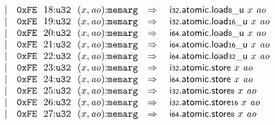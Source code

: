 $$\begin{array}[t]{@{}lrrl@{}l@{}l@{}l@{}}
& & | & \mathtt{0xFE}~~18{:}{\mathtt{u32}}~~(x, {\mathit{ao}}){:}{\mathtt{memarg}} & \quad\Rightarrow\quad{} & {\mathsf{i{\scriptstyle 32}}{.}\mathsf{atomic}{.}\mathsf{load}}{{\mathsf{{\scriptstyle 8}}}{\mathsf{\_}}{\mathsf{u}}}~x~{\mathit{ao}} \\
& & | & \mathtt{0xFE}~~19{:}{\mathtt{u32}}~~(x, {\mathit{ao}}){:}{\mathtt{memarg}} & \quad\Rightarrow\quad{} & {\mathsf{i{\scriptstyle 32}}{.}\mathsf{atomic}{.}\mathsf{load}}{{\mathsf{{\scriptstyle 16}}}{\mathsf{\_}}{\mathsf{u}}}~x~{\mathit{ao}} \\
& & | & \mathtt{0xFE}~~20{:}{\mathtt{u32}}~~(x, {\mathit{ao}}){:}{\mathtt{memarg}} & \quad\Rightarrow\quad{} & {\mathsf{i{\scriptstyle 64}}{.}\mathsf{atomic}{.}\mathsf{load}}{{\mathsf{{\scriptstyle 8}}}{\mathsf{\_}}{\mathsf{u}}}~x~{\mathit{ao}} \\
& & | & \mathtt{0xFE}~~21{:}{\mathtt{u32}}~~(x, {\mathit{ao}}){:}{\mathtt{memarg}} & \quad\Rightarrow\quad{} & {\mathsf{i{\scriptstyle 64}}{.}\mathsf{atomic}{.}\mathsf{load}}{{\mathsf{{\scriptstyle 16}}}{\mathsf{\_}}{\mathsf{u}}}~x~{\mathit{ao}} \\
& & | & \mathtt{0xFE}~~22{:}{\mathtt{u32}}~~(x, {\mathit{ao}}){:}{\mathtt{memarg}} & \quad\Rightarrow\quad{} & {\mathsf{i{\scriptstyle 64}}{.}\mathsf{atomic}{.}\mathsf{load}}{{\mathsf{{\scriptstyle 32}}}{\mathsf{\_}}{\mathsf{u}}}~x~{\mathit{ao}} \\
& & | & \mathtt{0xFE}~~23{:}{\mathtt{u32}}~~(x, {\mathit{ao}}){:}{\mathtt{memarg}} & \quad\Rightarrow\quad{} & \mathsf{i{\scriptstyle 32}}{.}\mathsf{atomic}{.}\mathsf{store}~x~{\mathit{ao}} \\
& & | & \mathtt{0xFE}~~24{:}{\mathtt{u32}}~~(x, {\mathit{ao}}){:}{\mathtt{memarg}} & \quad\Rightarrow\quad{} & \mathsf{i{\scriptstyle 64}}{.}\mathsf{atomic}{.}\mathsf{store}~x~{\mathit{ao}} \\
& & | & \mathtt{0xFE}~~25{:}{\mathtt{u32}}~~(x, {\mathit{ao}}){:}{\mathtt{memarg}} & \quad\Rightarrow\quad{} & {\mathsf{i{\scriptstyle 32}}{.}\mathsf{atomic}{.}\mathsf{store}}{\mathsf{{\scriptstyle 8}}}~x~{\mathit{ao}} \\
& & | & \mathtt{0xFE}~~26{:}{\mathtt{u32}}~~(x, {\mathit{ao}}){:}{\mathtt{memarg}} & \quad\Rightarrow\quad{} & {\mathsf{i{\scriptstyle 32}}{.}\mathsf{atomic}{.}\mathsf{store}}{\mathsf{{\scriptstyle 16}}}~x~{\mathit{ao}} \\
& & | & \mathtt{0xFE}~~27{:}{\mathtt{u32}}~~(x, {\mathit{ao}}){:}{\mathtt{memarg}} & \quad\Rightarrow\quad{} & {\mathsf{i{\scriptstyle 64}}{.}\mathsf{atomic}{.}\mathsf{store}}{\mathsf{{\scriptstyle 8}}}~x~{\mathit{ao}} \\

\end{array}$$

